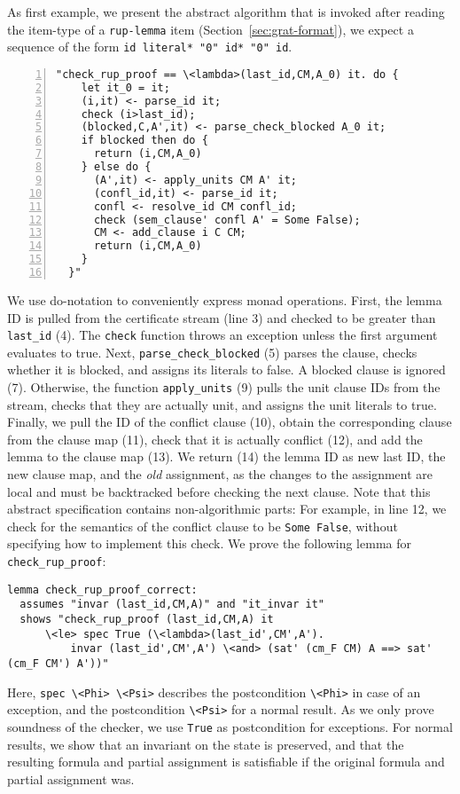 \documentclass{llncs}
\newcommand{\isai}{\lstinline[language=isabelle,basicstyle=\normalsize\ttfamily\slshape]}
\newcommand{\lsti}{\lstinline[language={},literate={}]}
\begin{document}
As first example, we present the abstract algorithm that is invoked after reading the item-type of a \lsti{rup-lemma} item (\cf Section~\ref{sec:grat-format}),
\ie we expect a sequence of the form \lstinline[language={},literate={}]{id literal* "0" id* "0" id}.
\begin{lstlisting}[numbers=left, xleftmargin=2em]
  "check_rup_proof == \<lambda>(last_id,CM,A_0) it. do {
    let it_0 = it;
    (i,it) <- parse_id it;
    check (i>last_id);
    (blocked,C,A',it) <- parse_check_blocked A_0 it;
    if blocked then do {
      return (i,CM,A_0)
    } else do {
      (A',it) <- apply_units CM A' it;
      (confl_id,it) <- parse_id it;
      confl <- resolve_id CM confl_id;
      check (sem_clause' confl A' = Some False);
      CM <- add_clause i C CM;
      return (i,CM,A_0)
    }
  }"
\end{lstlisting}
We use do-notation to conveniently express monad operations. 
First, the lemma ID is pulled from the certificate stream (line 3) and checked to be greater than \isai{last_id} (4).
The \isai$check$ function throws an exception unless the first argument evaluates to true.
Next, \isai{parse_check_blocked} (5) parses the clause, checks whether it is blocked, and assigns its literals to false. A blocked clause is ignored (7). Otherwise, the function
\isai$apply_units$ (9) pulls the unit clause IDs from the stream, checks that they are actually unit, and assigns the unit literals to true.
Finally, we pull the ID of the conflict clause (10), obtain the corresponding clause from the clause map (11), check that it is actually conflict (12), and add the lemma to the clause map (13). 
We return (14) the lemma ID as new last ID, the new clause map, and the \emph{old} assignment, as the changes to the assignment are local and must be backtracked before checking
the next clause.
Note that this abstract specification contains non-algorithmic parts: For example, in line 12, we check for the semantics of the conflict clause to be \isai{Some False}, without
specifying how to implement this check.
%
We prove the following lemma for \isai{check_rup_proof}:
\begin{lstlisting}
lemma check_rup_proof_correct: 
  assumes "invar (last_id,CM,A)" and "it_invar it"
  shows "check_rup_proof (last_id,CM,A) it 
      \<le> spec True (\<lambda>(last_id',CM',A'). 
          invar (last_id',CM',A') \<and> (sat' (cm_F CM) A ==> sat' (cm_F CM') A'))"  
\end{lstlisting}
Here, \isai{spec \<Phi> \<Psi>} describes the postcondition \isai$\<Phi>$ in case of an exception, and the postcondition \isai$\<Psi>$ for a normal result.
As we only prove soundness of the checker, we use \isai$True$ as postcondition for exceptions. For normal results, 
we show that an invariant on the state is preserved, and that the resulting formula and partial assignment is satisfiable if the original formula and partial assignment was.
\end{document}
